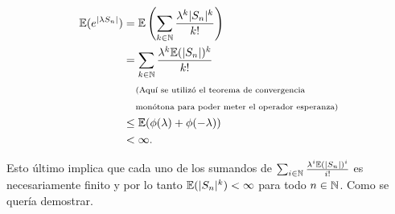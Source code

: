 \begin{align}
    \mathbb{E}(e^{|\lambda S_n|})   &=      \mathbb{E}\left(\sum_{k \in \mathbb{N}} \frac{\lambda^k |S_n|^k}{k!}\right)                                         \\
                            &=      \sum_{k \in \mathbb{N}} \frac{\lambda^k \mathbb{E}(|S_n|)^k}{k!}                                                    \\
                            &\;\;\;\;\mbox{{\scriptsize(Aquí se utilizó el teorema de convergencia}}                                                      \\
                            &\;\;\;\;\mbox{{\scriptsize monótona para poder meter el operador esperanza)}}                                                 \\
                            &\leq   \mathbb{E}(\phi(\lambda) + \phi(-\lambda))                                                                  \\
                            &<      \infty.
\end{align}\par\null

Esto último implica que cada uno de los sumandos de $\sum_{i \in \mathbb{N}} \frac{\lambda^i \mathbb{E}(|S_n|)^i}{i!}$ es necesariamente finito y por lo tanto
$\mathbb{E}(|S_n|^k) < \infty$ para todo $n \in \mathbb{N}$. Como se quería demostrar.